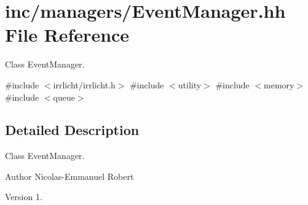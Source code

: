 \hypertarget{EventManager_8hh}{}\section{inc/managers/\+Event\+Manager.hh File Reference}
\label{EventManager_8hh}


Class Event\+Manager.  


{\ttfamily \#include $<$irrlicht/irrlicht.\+h$>$}\newline
{\ttfamily \#include $<$utility$>$}\newline
{\ttfamily \#include $<$memory$>$}\newline
{\ttfamily \#include $<$queue$>$}\newline


\subsection{Detailed Description}
Class Event\+Manager. 

\begin{DoxyAuthor}{Author}
Nicolas-\/\+Emmanuel Robert 
\end{DoxyAuthor}
\begin{DoxyVersion}{Version}
1. 
\end{DoxyVersion}
